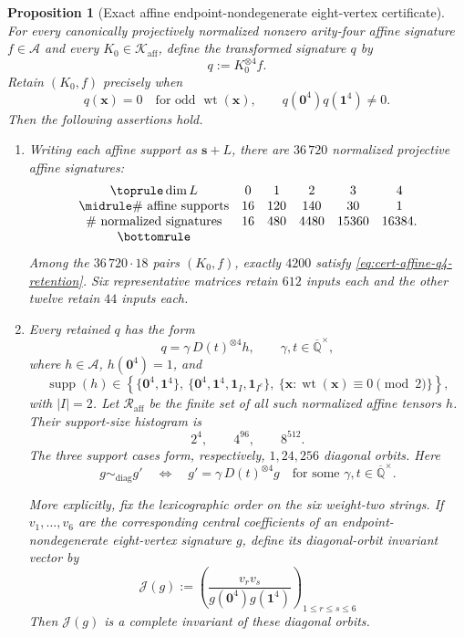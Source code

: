 \documentclass[11pt,letterpaper,onecolumn]{article}
\theoremstyle{plain}
\newtheorem{proposition}[proposition]{Proposition}
\theoremstyle{definition}
\theoremstyle{remark}
\newcommand{\AlgNums}{\overline{\mathbb Q}}
\newcommand{\cA}{\mathscr A}
\newcommand{\wt}{\operatorname{wt}}
\newcommand{\supp}{\operatorname{supp}}
\newcommand{\one}{\mathbf 1}
\newcommand{\zero}{\mathbf 0}
\begin{document}
\begin{proposition}[Exact affine endpoint-nondegenerate eight-vertex certificate]
\label{prop:cert-affine-q4-endpoint}
For every canonically projectively normalized nonzero arity-four affine signature
\(f\in\cA\) and every \(K_0\in\mathscr K_{\mathrm{aff}}\), define the
transformed signature \(q\) by
\[
  q:=K_0^{\otimes4}f.
\]
Retain \((K_0,f)\) precisely when
\begin{equation}
  q({\mathbf{x}})=0\quad\text{for odd }\wt({\mathbf{x}}),
  \qquad
  q(\zero^4)q(\one^4)\ne0.
  \label{eq:cert-affine-q4-retention}
\end{equation}
Then the following assertions hold.

\begin{enumerate}[label=\textnormal{(\roman*)}]
\item Writing each affine support as \({\mathbf{s}}+L\), there are \(36\,720\)
normalized projective affine signatures:
\[
\begin{array}{cccccc}
\toprule
\dim L&0&1&2&3&4\\ \midrule
\#\text{ affine supports}&16&120&140&30&1\\
\#\text{ normalized signatures}&16&480&4480&15360&16384.\\
\bottomrule
\end{array}
\]
Among the \(36\,720\cdot18\) pairs \((K_0,f)\), exactly \(4200\)
satisfy \cref{eq:cert-affine-q4-retention}.  Six representative matrices retain \(612\)
inputs each and the other twelve retain \(44\) inputs each.

\item Every retained \(q\) has the form
\begin{equation}
  q=\gamma\,D(t)^{\otimes4}h,
  \qquad
  \gamma,t\in\AlgNums^\times,
  \label{eq:cert-affine-q4-diagonal-form}
\end{equation}
where \(h\in\cA\), \(h(\zero^4)=1\), and
\[
 \supp(h)\in
 \left\{
  \{\zero^4,\one^4\},\
  \{\zero^4,\one^4,\one_I,\one_{I^c}\},\
  \{{\mathbf{x}}:\wt({\mathbf{x}})\equiv0\pmod2\}
 \right\},
\]
with \(|I|=2\).  Let \(\mathscr R_{\mathrm{aff}}\) be the finite set of all
such normalized affine tensors \(h\).  Their support-size histogram is
\[
  2^4,\qquad4^{96},\qquad8^{512}.
\]
The three support cases form, respectively, \(1,24,256\) diagonal orbits.
Here
\[
 g\sim_{\mathrm{diag}}g'
 \quad\Longleftrightarrow\quad
 g'=\gamma\,D(t)^{\otimes4}g
 \quad\text{for some }\gamma,t\in\AlgNums^\times.
\]

More explicitly, fix the lexicographic order on the six weight-two strings.
If \(v_1,\ldots,v_6\) are the corresponding central coefficients of an
endpoint-nondegenerate eight-vertex signature \(g\), define its
diagonal-orbit invariant vector by
\begin{equation}
 \mathcal J(g):=
 \left(
 \frac{v_rv_s}{g(\zero^4)g(\one^4)}
 \right)_{1\le r\le s\le6}
 \label{eq:cert-affine-q4-invariant}
\end{equation}
Then \(\mathcal J(g)\) is a complete invariant of these diagonal orbits.


\end{enumerate}
\end{proposition}
\end{document}
